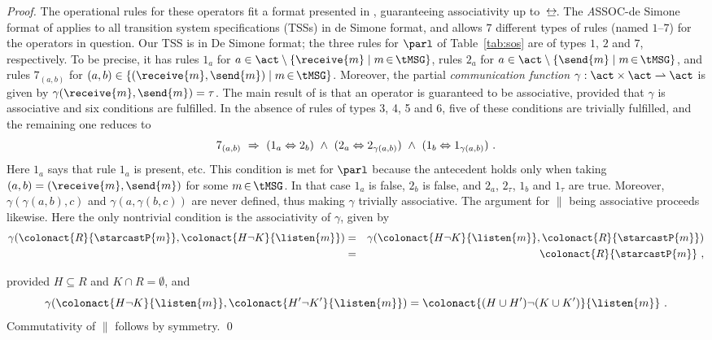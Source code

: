 \documentclass[envcountsame,envcountsect,orivec,runningheads]{llncs}
\newcommand{\bis}{\ensuremath{\mathop{\,\raisebox{.3ex}{$\underline{\makebox[.7em]{$\leftrightarrow$}}$}\xspace}}}
\newcommand{\ans}{\spaces{\wedge}}
\newcommand{\ims}{\spaces{\Rightarrow}}
\begin{document}
\begin{proof}
The operational rules for these operators fit a format presented in \cite{CMR08},
guaranteeing associativity up to~$\bis$.
The {\emph ASSOC-de Simone format} of \cite{CMR08} applies to all 
transition system specifications (TSSs) in de
Simone format, and allows $7$ different types of rules (named $1$--$7$) for the operators in question.
Our TSS is in De Simone format; the three rules for $\parl$ of
Table~\ref{tab:sos} are of types $1$, $2$ and $7$, respectively.
To be precise, it has rules $1_a$ for $a \in \act \setminus                      
\{\receive{m}\mid m\mathop\in\tMSG\}$, rules $2_a$ for $a \in \act \setminus                      
\{\send{m}\mid m\mathop\in\tMSG\}$, and rules $7_{(a,b)}$ for
$(a,b)\in\{(\receive{m},\send{m})\mid m\mathop\in\tMSG\}$.
Moreover, the partial \emph{communication function}
$\gamma:\act\times\act\rightharpoonup \act$ is given by
$\gamma(\receive{m},\send{m})=\tau$.
The main result of \cite{CMR08} is that an operator is guaranteed to
be associative, provided that $\gamma$ is associative and six
conditions are fulfilled. In the absence of rules of types 3, 4, 5
and 6, five of these conditions are trivially fulfilled, and the
remaining one reduces to
$$7_{(a,b)} \ims (1_a \Leftrightarrow 2_b)
           \ans (2_a \Leftrightarrow 2_{\gamma(a,b)})
           \ans (1_b \Leftrightarrow 1_{\gamma(a,b)})\ .$$
Here $1_a$ says that rule $1_a$ is present, etc.
This condition is met for $\parl$ because the antecedent holds only
when taking $(a,b)=(\receive{m},\send{m})$ for some $m\mathop\in\tMSG$.
In that case $1_a$ is false, $2_b$ is false, and $2_a$, $2_\tau$,
$1_b$ and $1_\tau$ are true. Moreover, $\gamma(\gamma(a,b),c)$ and
$\gamma(a,\gamma(b,c))$ are never defined, thus making $\gamma$
trivially associative.
The argument for $\|$ being associative proceeds likewise.
Here the only nontrivial condition is the associativity of $\gamma$,
given by
\begin{eqnarray*}
\gamma(\colonact{R}{\starcastP{m}},\colonact{H\neg K}{\listen{m}})&=&
 \gamma(\colonact{H\neg K}{\listen{m}},\colonact{R}{\starcastP{m}})\\
&=& \colonact{R}{\starcastP{m}}\ ,
\end{eqnarray*}
\vspace{-4ex}

\noindent
provided $H\subseteq R$ and $K\cap R =\emptyset$, and
$$\gamma(\colonact{H\neg K}{\listen{m}},\colonact{H'\neg K'}{\listen{m}})
 =\colonact{(H\cup H')\neg(K\cup K')}{\listen{m}}\ .$$
Commutativity of $\|$ follows by symmetry.
\hspace{-3cm}
\qed
\end{proof}
\end{document}

